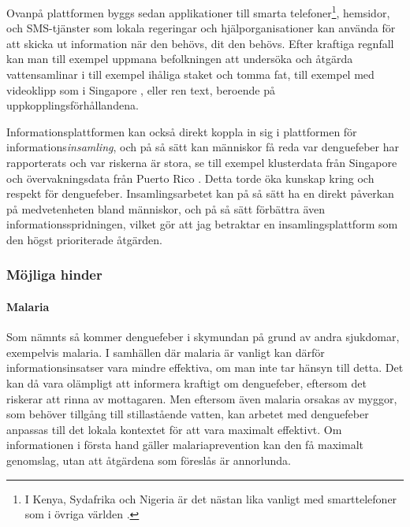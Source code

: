 \documentclass{article}
\begin{document}
Ovanpå plattformen byggs sedan applikationer till smarta telefoner\footnote{I Kenya, Sydafrika och Nigeria är det nästan lika vanligt med smarttelefoner som i övriga världen .}, hemsidor, och SMS-tjänster som lokala regeringar och hjälporganisationer kan använda för att skicka ut information när den behövs, dit den behövs. Efter kraftiga regnfall kan man till exempel uppmana befolkningen att undersöka och åtgärda vattensamlinar i till exempel ihåliga staket och tomma fat, till exempel med videoklipp som i Singapore , eller ren text, beroende på uppkopplingsförhållandena.
 
Informationsplattformen kan också direkt koppla in sig i plattformen för informations\emph{insamling}, och på så sätt kan människor få reda var denguefeber har rapporterats och var riskerna är stora, se till exempel klusterdata från Singapore  och övervakningsdata från Puerto Rico . Detta torde öka kunskap kring och respekt för denguefeber. Insamlingsarbetet kan på så sätt ha en direkt påverkan på medvetenheten bland människor, och på så sätt förbättra även informationsspridningen, vilket gör att jag betraktar en insamlingsplattform som den högst prioriterade åtgärden.

\subsubsection{Möjliga hinder}

\paragraph{Malaria}
Som nämnts så kommer denguefeber i skymundan på grund av andra sjukdomar, exempelvis malaria. I samhällen där malaria är vanligt kan därför informationsinsatser vara mindre effektiva, om man inte tar hänsyn till detta. Det kan då vara olämpligt att informera kraftigt om denguefeber, eftersom det riskerar att rinna av mottagaren. Men eftersom även malaria orsakas av myggor, som behöver tillgång till stillastående vatten, kan arbetet med denguefeber anpassas till det lokala kontextet för att vara maximalt effektivt. Om informationen i första hand gäller malariaprevention kan den få maximalt genomslag, utan att åtgärdena som föreslås är annorlunda.
\end{document}
